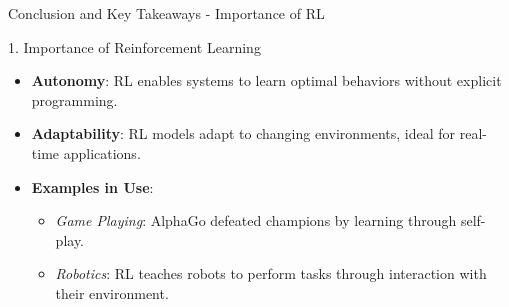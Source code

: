 \documentclass[aspectratio=169]{beamer}
\begin{document}
\begin{frame}[fragile]{Conclusion and Key Takeaways - Importance of RL}
    \begin{block}{1. Importance of Reinforcement Learning}
        \begin{itemize}
            \item \textbf{Autonomy}: RL enables systems to learn optimal behaviors without explicit programming.
            \item \textbf{Adaptability}: RL models adapt to changing environments, ideal for real-time applications.
            \item \textbf{Examples in Use}:
            \begin{itemize}
                \item \textit{Game Playing}: AlphaGo defeated champions by learning through self-play.
                \item \textit{Robotics}: RL teaches robots to perform tasks through interaction with their environment.
            \end{itemize}
        \end{itemize}
    \end{block}
\end{frame}
\end{document}
